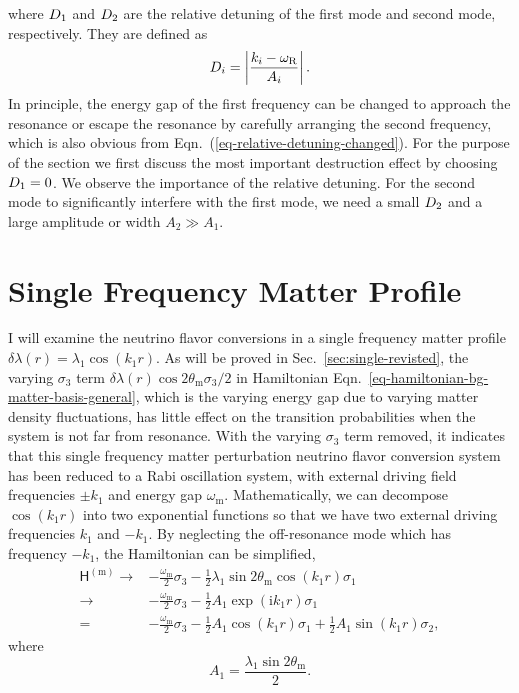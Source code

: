 where $D_1$ and $D_2$ are the relative detuning of the first mode and second mode, respectively. They are defined as
\begin{equation*}
D_i =  \left\lvert \frac{ k_i - \omega_{\mathrm R}}{A_i} \right \rvert.
\end{equation*}
In principle, the energy gap of the first frequency can be changed to approach the resonance or escape the resonance by carefully arranging the second frequency, which is also obvious from Eqn.~(\ref{eq-relative-detuning-changed}). For the purpose of the section we first discuss the most important destruction effect by choosing $D_1 = 0$. We observe the importance of the relative detuning. For the second mode to significantly interfere with the first mode, we need a small $D_2$ and a large amplitude or width $A_2\gg A_1$.


\section{Single Frequency Matter Profile}


I will examine the neutrino flavor conversions in a single frequency matter profile $\delta\lambda(r) = \lambda_1 \cos(k_1 r)$. As will be proved in Sec.~\ref{sec:single-revisted}, the varying $\sigma_3$ term $\delta\lambda(r) \cos 2\theta_{\mathrm m} \sigma_3/2$ in Hamiltonian Eqn.~\ref{eq-hamiltonian-bg-matter-basis-general}, which is the varying energy gap due to varying matter density fluctuations, has little effect on the transition probabilities when the system is not far from resonance. With the varying $\sigma_3$ term removed, it indicates that this single frequency matter perturbation neutrino flavor conversion system has been reduced to a Rabi oscillation system, with external driving field frequencies $\pm k_1$ and energy gap $\omega_{\mathrm m}$. Mathematically, we can decompose $\cos( k_1 r )$ into two exponential functions so that we have two external driving frequencies $k_1$ and $-k_1$. By neglecting the off-resonance mode which has frequency $-k_1$, the Hamiltonian can be simplified,
\begin{align}
\mathsf H^{(\mathrm{m})} \to & -\frac{\omega_{\mathrm m}}{2} \sigma_3  - \frac{1}{2} \lambda_1 \sin 2\theta_{\mathrm m} \cos( k_1 r ) \sigma_1\label{eq-hamiltonian-bg-matter-basis-single-frequency} \\
\to & -\frac{\omega_{\mathrm m}}{2} \sigma_3  - \frac{1}{2} A_1 \exp (\mathrm ik_1 r) \sigma_1 \nonumber \\
= & -\frac{\omega_{\mathrm m}}{2} \sigma_3  - \frac{1}{2} A_1 \cos ( k_1 r)  \sigma_1 + \frac{1}{2} A_1\sin(k_1 r) \sigma_2,\nonumber
\end{align}
where
\begin{equation}
A_1 = \frac{\lambda_1 \sin 2\theta_{\mathrm m} }{2}.
\label{eq-define-a1}
\end{equation}

